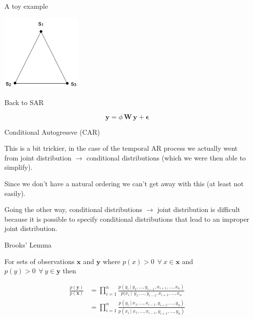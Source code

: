 \documentclass[11pt,ignorenonframetext,]{beamer}
\begin{document}
\begin{frame}[t]{A toy example}
\protect\hypertarget{a-toy-example}{}

\begin{center}
\includegraphics[width=0.3\textwidth]{figs/triangle_adj.png} \\
\end{center}

\end{frame}

\begin{frame}[t]{Back to SAR}
\protect\hypertarget{back-to-sar}{}

\[ \symbf{y} = \phi \, \symbf{W} \, \symbf{y} + \symbf{\epsilon} \]

\end{frame}

\begin{frame}[t]{Conditional Autogressve (CAR)}
\protect\hypertarget{conditional-autogressve-car}{}

This is a bit trickier, in the case of the temporal AR process we
actually went from joint distribution \(\to\) conditional distributions
(which we were then able to simplify).

\vspace{3mm}

Since we don’t have a natural ordering we can’t get away with this (at
least not easily).

\vspace{3mm}

Going the other way, conditional distributions \(\to\) joint
distribution is difficult because it is possible to specify conditional
distributions that lead to an improper joint distribution.

\end{frame}

\begin{frame}[t]{Brooks’ Lemma}
\protect\hypertarget{brooks-lemma}{}

For sets of observations \(\symbf{x}\) and \(\symbf{y}\) where
\(p(x) > 0~~\forall ~ x\in\symbf{x}\) and
\(p(y) > 0~~\forall ~ y\in\symbf{y}\) then

\[\begin{aligned}
\frac{p(\symbf{y})}{p(\symbf{x})} 
  &= \prod_{i=1}^n \frac{p(y_i ~|~ y_1,\ldots,y_{i-1},x_{i+1},\ldots,x_n)}{p(x_i ~|~ ~ y_1,\ldots,y_{i-1},x_{i+1},\ldots,x_n} \\
  &= \prod_{i=1}^n \frac{p(y_i ~|~ x_1,\ldots,x_{i-1},y_{i+1},\ldots,y_n)}{p(x_i ~|~ x_1,\ldots,x_{i-1},y_{i+1},\ldots,y_n)} \\
\end{aligned}\]

\end{frame}
\end{document}
